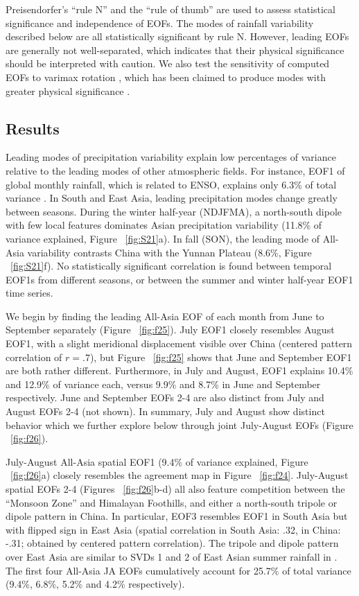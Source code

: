 	Preisendorfer's ``rule N'' \citep{Preisendorfer1981} and the \cite{North1982} ``rule of thumb'' are used to assess statistical significance and independence of EOFs. The modes of rainfall variability described below are all statistically significant by rule N. However, leading EOFs  are generally not well-separated, which indicates that their physical significance should be interpreted with caution. We also test the sensitivity of computed EOFs to varimax rotation \citep{Kaiser1958}, which has been claimed to produce modes with greater physical significance \citep{Wilks2006}.
	
\subsection{Results}	
	
	Leading modes of precipitation variability explain low percentages of variance relative to the leading modes of other atmospheric fields. For instance, EOF1 of global monthly rainfall, which is related to ENSO, explains only 6.3\% of total variance \citep{Dai1997}. In South and East Asia, leading precipitation modes change greatly between seasons. During the winter half-year (NDJFMA), a north-south dipole with few local features dominates Asian precipitation variability (11.8\% of variance explained, Figure ~\ref{fig:S21}a). In fall (SON), the leading mode of All-Asia variability contrasts China with the Yunnan Plateau (8.6\%, Figure ~\ref{fig:S21}f). No statistically significant correlation is found between temporal EOF1s from different seasons, or between the summer and winter half-year EOF1 time series.

	We begin by finding the leading All-Asia EOF of each month from June to September separately (Figure ~\ref{fig:f25}). July EOF1 closely resembles August EOF1, with a slight meridional displacement visible over China (centered pattern correlation of $r=.7$), but Figure ~\ref{fig:f25} shows that June and September EOF1 are both rather different. Furthermore, in July and August, EOF1 explains 10.4\% and 12.9\% of variance each, versus 9.9\% and 8.7\% in June and September respectively. June and September EOFs 2-4 are also distinct from July and August EOFs 2-4 (not shown). In summary, July and August show distinct behavior which we further explore below through joint July-August EOFs (Figure ~\ref{fig:f26}).

	July-August All-Asia spatial EOF1 (9.4\% of variance explained, Figure ~\ref{fig:f26}a) closely resembles the agreement map in Figure ~\ref{fig:f24}. July-August spatial EOFs 2-4 (Figures ~\ref{fig:f26}b-d) all also feature competition between the ``Monsoon Zone'' and Himalayan Foothills, and either a north-south tripole or dipole pattern in China. In particular, EOF3 resembles EOF1 in South Asia but with flipped sign in East Asia (spatial correlation in South Asia: .32, in China: -.31; obtained by centered pattern correlation). The tripole and dipole pattern over East Asia are similar to SVDs 1 and 2 of East Asian summer rainfall in \cite{Kosaka2011}. The first four All-Asia JA EOFs cumulatively account for 25.7\% of total variance (9.4\%, 6.8\%, 5.2\% and 4.2\% respectively). 
	

